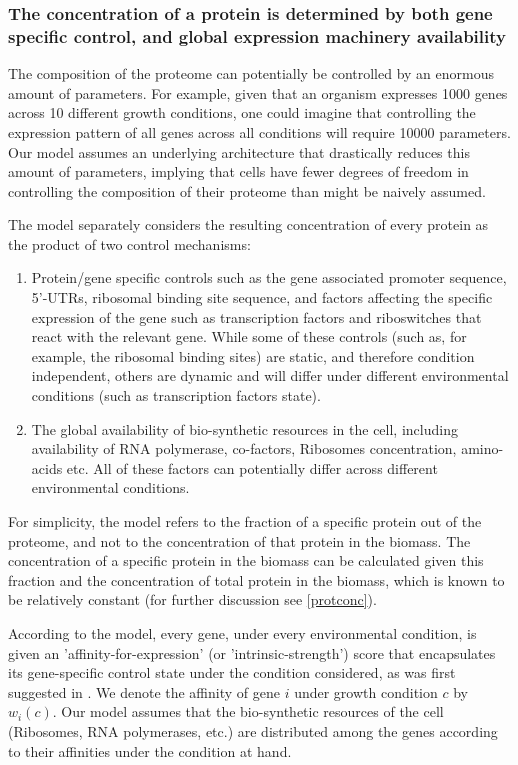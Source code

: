\subsubsection{The concentration of a protein is determined by both gene specific control, and global
expression machinery availability}
The composition of the proteome can potentially be controlled by an enormous amount of parameters.
For example, given that an organism expresses 1000 genes across 10 different growth conditions, one could imagine that controlling the expression pattern of all genes across all conditions will require 10000 parameters.
Our model assumes an underlying architecture that drastically reduces this amount of parameters, implying that cells have fewer degrees of freedom in controlling the composition of their proteome than might be naively assumed.

The model separately considers the resulting concentration of every protein as the product of two control mechanisms:
\begin{enumerate}
\item Protein/gene specific controls such as the gene associated promoter sequence, 5'-UTRs, ribosomal binding site sequence, and factors affecting the specific expression of the gene such as transcription factors and riboswitches that react with the relevant gene.
  While some of these controls (such as, for example, the ribosomal binding sites) are static, and therefore condition independent, others are dynamic and will differ under different environmental conditions (such as transcription factors state).
\item The global availability of bio-synthetic resources in the cell, including availability of RNA polymerase, co-factors, Ribosomes concentration, amino-acids etc.
  All of these factors can potentially differ across different environmental conditions.
\end{enumerate}

For simplicity, the model refers to the fraction of a specific protein out of the proteome, and not to the concentration of that protein in the biomass.
The concentration of a specific protein in the biomass can be calculated given this fraction and the concentration of total protein in the biomass, which is known to be relatively constant \cite{Bremer1987,Scott2014} (for further discussion see \ref{protconc}).

According to the model, every gene, under every environmental condition, is given an 'affinity-for-expression' (or 'intrinsic-strength') score that encapsulates its gene-specific control state under the condition considered, as was first suggested in \cite{Maaloe1969}.
We denote the affinity of gene $i$ under growth condition $c$ by $w_i(c)$.
Our model assumes that the bio-synthetic resources of the cell (Ribosomes, RNA polymerases, etc.) are distributed among the genes according to their affinities under the condition at hand.

